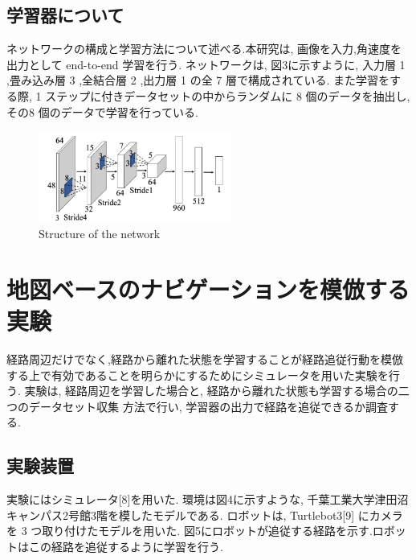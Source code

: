 \documentclass{jarticle}
\begin{document}
\subsection{学習器について}
ネットワークの構成と学習方法について述べる.本研究は,
画像を入力,角速度を出力として end-to-end 学習を行う.
ネットワークは, 図3に示すように, 入力層 1 ,畳み込み層 3 ,全結合層 2 ,出力層 1 の全 7 層で構成されている.
また学習をする際, 1 ステップに付きデータセットの中からランダムに 8 個のデータを抽出し, 
その8 個のデータで学習を行っている.


\begin{figure}[h!]
  \centering
   \includegraphics[height=30mm]{./figs/gaku2.png}
   \caption{Structure of the network}
\end{figure}


\section{地図ベースのナビゲーションを模倣する実験}

経路周辺だけでなく,経路から離れた状態を学習することが経路追従行動を模倣
する上で有効であることを明らかにするためにシミュレータを用いた実験を行う. 
実験は, 経路周辺を学習した場合と, 経路から離れた状態も学習する場合の二つのデータセット収集
方法で行い, 学習器の出力で経路を追従できるか調査する.

\subsection{実験装置}
実験にはシミュレータ[8]を用いた.
環境は図4に示すような, 千葉工業大学津田沼キャンパス2号館3階を模したモデルである.
ロボットは,  Turtlebot3[9] にカメラを 3 つ取り付けたモデルを用いた. 
図5にロボットが追従する経路を示す.ロボットはこの経路を追従するように学習を行う.
\end{document}
